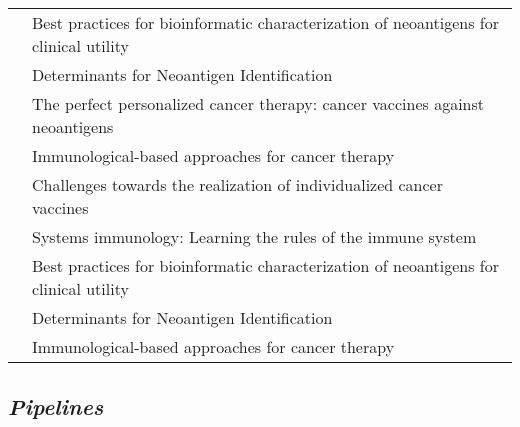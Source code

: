 \begin{table}[H]
\begin{tabular}{p{3cm}p{10cm}}
		\cite{richters2019best}       & Best practices for bioinformatic characterization of neoantigens for clinical utility                                                         \\
		\cite{garcia2019determinants} & Determinants for Neoantigen Identification                                                                                                    \\
		\cite{aurisicchio2018perfect} & The perfect personalized cancer therapy: cancer vaccines against neoantigens                                                                  \\
		\cite{barros2018immunological}& Immunological-based approaches for cancer therapy                                                                                             \\
		\cite{tureci2018challenges}   & Challenges towards the realization of individualized cancer vaccines                                                                          \\
		\cite{villani2018systems}     & Systems immunology: Learning the rules of the immune system                                                                                   \\
		\cite{richters2019best}       & Best practices for bioinformatic characterization of neoantigens for clinical utility                                                         \\
		\cite{garcia2019determinants} & Determinants for Neoantigen Identification                                                                                                    	                                                               \\
		\cite{barros2018immunological}& Immunological-based approaches for cancer therapy                                                                                            \\	
	                                                                                
	\end{tabular}
\end{table}



\subsection{\textit{Pipelines}}

